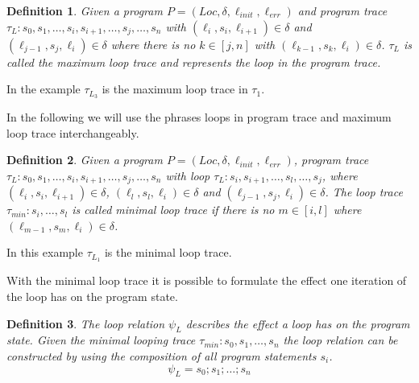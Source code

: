 \documentclass{article}
\newcommand{\Loc}{\ensuremath{\mathit{Loc}}\xspace}
\newcommand{\err}{\ensuremath{\mathit{err}}\xspace}
\newcommand{\init}{\ensuremath{\mathit{init}}\xspace}
\newcommand{\loc}[1]{\ensuremath{\ell_{#1}}}
\newcounter{example}[section]
\newtheorem{mydef}{Definition}
\newcommand\mycom[1]{}
\newcommand\mycom[1]{#1}
\newcommand{\dd}[1]{\mycom{\todo[color=orange!40,inline]{\small DD: #1}}}
\newcommand{\ts}[1]{\mycom{\todo[color=green!40,inline]{\small TS: #1}}}
\begin{document}
\begin{mydef}
	Given a program $P = (\Loc, \delta, \ell_\init, \ell_\err)$ and program trace \\ $\tau_L: s_0, s_1, \ldots, s_i, s_{i+1}, \ldots, s_j, \ldots, s_n$ with $(\loc{i}, s_i, \loc{i+1}) \in \delta$ and $(\loc{j-1}, s_j, \loc{i}) \in \delta$ where there is no $k \in [j, n]$ with $(\loc{k-1}, s_k, \loc{i}) \in \delta$. $\tau_L$ is called the maximum loop trace and represents the loop in the program trace.
\end{mydef}
\ts{In the definition above, a loop trace is a sub trace starting with the loop head.
	Shouldn't $\tau_L$ then also start with the loop head?
	Otherwise, $\tau_{L_3}$ does not match the definition.}
In the example $\tau_{L_3}$ is the maximum loop trace in $\tau_1$.
\dd{which example?}
In the following we will use the phrases loops in program trace and maximum loop trace interchangeably.

\begin{mydef}
	Given a program $P = (\Loc, \delta, \ell_\init, \ell_\err)$, program trace \\ $\tau_L: s_0, s_1, \ldots, s_i, s_{i+1}, \ldots, s_j, \ldots, s_n$ with loop $\tau_L: s_i, s_{i+1}, \ldots, s_l, \ldots, s_j$, where $(\loc{i}, s_i, \loc{i+1}) \in \delta$, $(\loc{l}, s_l, \loc{i}) \in \delta$ and $(\loc{j-1}, s_j, \loc{i}) \in \delta$. The loop trace $\tau_{min}: s_i, \ldots, s_l$ is called minimal loop trace if there is no $m \in [i, l]$ where $(\loc{m-1}, s_m, \loc{i}) \in \delta$.
\end{mydef}
\ts{Complicated. I don't think you need a loop containing another loop for this definition.}

In this example $\tau_{L_1}$ is the minimal loop trace.
\dd{which example?}

With the minimal loop trace it is possible to formulate the effect one iteration of the loop has on the program state.
\begin{mydef}
	The loop relation $\psi_L$ describes the effect a loop has on the program state.
	Given the minimal looping trace $\tau_{min}: s_0, s_1, \ldots, s_{n}$ the loop relation can be constructed by using the composition of all program statements $s_i$.
	\begin{equation*}
		\psi_L = s_0; s_1; \ldots; s_n
	\end{equation*}
\end{mydef}
\dd{Dont switch between ``loop trace'' and ``looping trace''}
\end{document}
